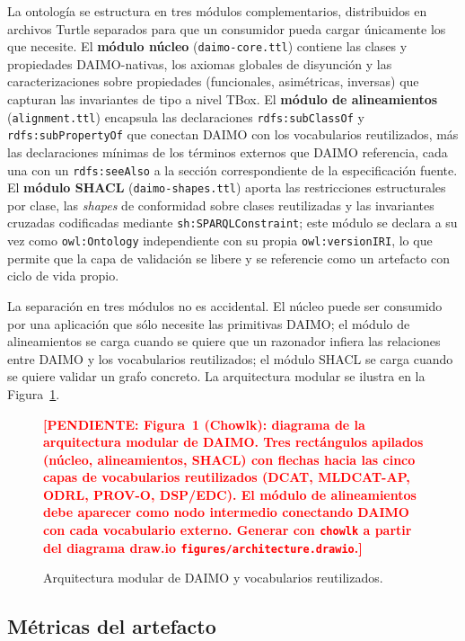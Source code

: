 \documentclass[11pt,a4paper]{article}
\newcommand{\code}[1]{\texttt{#1}}
\newcommand{\TODO}[1]{\textcolor{red}{\textbf{[PENDIENTE: #1]}}}
\begin{document}
La ontología se estructura en tres módulos complementarios, distribuidos en archivos Turtle separados para que un consumidor pueda cargar únicamente los que necesite. El \textbf{módulo núcleo} (\code{daimo-core.ttl}) contiene las clases y propiedades DAIMO-nativas, los axiomas globales de disyunción y las caracterizaciones sobre propiedades (funcionales, asimétricas, inversas) que capturan las invariantes de tipo a nivel TBox. El \textbf{módulo de alineamientos} (\code{alignment.ttl}) encapsula las declaraciones \code{rdfs:subClassOf} y \code{rdfs:subPropertyOf} que conectan DAIMO con los vocabularios reutilizados, más las declaraciones mínimas de los términos externos que DAIMO referencia, cada una con un \code{rdfs:seeAlso} a la sección correspondiente de la especificación fuente. El \textbf{módulo SHACL} (\code{daimo-shapes.ttl}) aporta las restricciones estructurales por clase, las \emph{shapes} de conformidad sobre clases reutilizadas y las invariantes cruzadas codificadas mediante \code{sh:SPARQLConstraint}; este módulo se declara a su vez como \code{owl:Ontology} independiente con su propia \code{owl:versionIRI}, lo que permite que la capa de validación se libere y se referencie como un artefacto con ciclo de vida propio.

La separación en tres módulos no es accidental. El núcleo puede ser consumido por una aplicación que sólo necesite las primitivas DAIMO; el módulo de alineamientos se carga cuando se quiere que un razonador infiera las relaciones entre DAIMO y los vocabularios reutilizados; el módulo SHACL se carga cuando se quiere validar un grafo concreto. La arquitectura modular se ilustra en la Figura~\ref{fig:architecture}.

\begin{figure}[t]
\centering
\TODO{Figura~1 (Chowlk): diagrama de la arquitectura modular de DAIMO. Tres rectángulos apilados (núcleo, alineamientos, SHACL) con flechas hacia las cinco capas de vocabularios reutilizados (DCAT, MLDCAT-AP, ODRL, PROV-O, DSP/EDC). El módulo de alineamientos debe aparecer como nodo intermedio conectando DAIMO con cada vocabulario externo. Generar con \texttt{chowlk} a partir del diagrama draw.io \texttt{figures/architecture.drawio}.}
\caption{Arquitectura modular de DAIMO y vocabularios reutilizados.}
\label{fig:architecture}
\end{figure}

\subsection{Métricas del artefacto}\label{sec:metrics}
\end{document}
